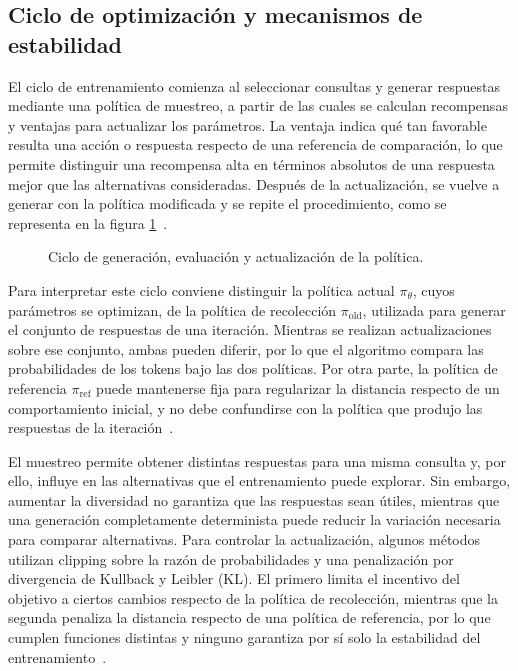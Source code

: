 \subsection{Ciclo de optimización y mecanismos de estabilidad}
\label{sec:ciclo-optimizacion}
El ciclo de entrenamiento comienza al seleccionar consultas y generar respuestas mediante una política de muestreo, a partir de las cuales se calculan recompensas y ventajas para actualizar los parámetros. La ventaja indica qué tan favorable resulta una acción o respuesta respecto de una referencia de comparación, lo que permite distinguir una recompensa alta en términos absolutos de una respuesta mejor que las alternativas consideradas. Después de la actualización, se vuelve a generar con la política modificada y se repite el procedimiento, como se representa en la figura \ref{fig:ciclo-rl}~\cite{schulman2017ppo,shao2024deepseekmath}.

\begin{figure}[htbp]
\centering

\caption{Ciclo de generación, evaluación y actualización de la política.}
\label{fig:ciclo-rl}
\end{figure}

Para interpretar este ciclo conviene distinguir la política actual $\pi_\theta$, cuyos parámetros se optimizan, de la política de recolección $\pi_{\mathrm{old}}$, utilizada para generar el conjunto de respuestas de una iteración. Mientras se realizan actualizaciones sobre ese conjunto, ambas pueden diferir, por lo que el algoritmo compara las probabilidades de los tokens bajo las dos políticas. Por otra parte, la política de referencia $\pi_{\mathrm{ref}}$ puede mantenerse fija para regularizar la distancia respecto de un comportamiento inicial, y no debe confundirse con la política que produjo las respuestas de la iteración~\cite{shao2024deepseekmath}.

El muestreo permite obtener distintas respuestas para una misma consulta y, por ello, influye en las alternativas que el entrenamiento puede explorar. Sin embargo, aumentar la diversidad no garantiza que las respuestas sean útiles, mientras que una generación completamente determinista puede reducir la variación necesaria para comparar alternativas. Para controlar la actualización, algunos métodos utilizan clipping sobre la razón de probabilidades y una penalización por divergencia de Kullback y Leibler (KL). El primero limita el incentivo del objetivo a ciertos cambios respecto de la política de recolección, mientras que la segunda penaliza la distancia respecto de una política de referencia, por lo que cumplen funciones distintas y ninguno garantiza por sí solo la estabilidad del entrenamiento~\cite{schulman2017ppo,ouyang2022instructgpt}.

